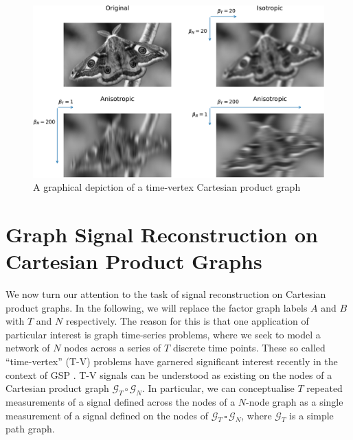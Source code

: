 \begin{figure}[t]
    \includegraphics[width=0.9\linewidth]{Figures/filter_types_butterfly.pdf}
    \caption[A time-vertex Cartesian product graph]{A graphical depiction of a time-vertex Cartesian product graph}
    \label{fig:filters}
\end{figure}



\section{Graph Signal Reconstruction on Cartesian Product Graphs}

\label{sec:gsr_cpg}

We now turn our attention to the task of signal reconstruction on Cartesian product graphs. In the following, we will replace the factor graph labels $A$ and $B$ with $T$ and $N$ respectively. The reason for this is that one application of particular interest is graph time-series problems, where we seek to model a network of $N$ nodes across a series of $T$ discrete time points. These so called ``time-vertex'' (T-V) problems have garnered significant interest recently in the context of GSP \citep{Grassi2018, Isufi2017, Loukas2016}. T-V signals can be understood as existing on the nodes of a Cartesian product graph $\mathcal{G}_T \, \square \, \mathcal{G}_N$. In particular, we can conceptualise $T$ repeated measurements of a signal defined across the nodes of a $N$-node graph as a single measurement of a signal defined on the nodes of $\mathcal{G}_T \, \square \, \mathcal{G}_N$, where $\mathcal{G}_T$ is a simple path graph.

\vspace{1cm}



